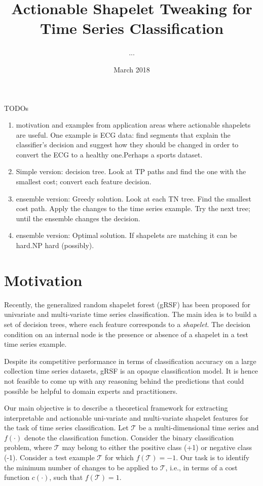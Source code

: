 \documentclass[smallextended,natbib]{svjour3}
\title{Actionable Shapelet Tweaking for Time Series Classification}
\author{...}
\date{March 2018}
\begin{document}
\maketitle

TODOs
\begin{enumerate}
\item motivation and examples from application areas where actionable shapelets are useful. One example is ECG data: find segments that explain the classifier's decision and suggest how they should be changed in order to convert the ECG to a healthy one.Perhaps a sports dataset.

\item Simple version: decision tree. Look at TP paths and find the one with the smallest cost; convert each feature decision.

\item ensemble version: Greedy solution. Look at each TN tree. Find the smallest cost path. Apply the changes to the time series example. Try the next tree; until the ensemble changes the decision. 

\item  ensemble version: Optimal solution. If shapelets are matching it can be hard.NP hard (possibly). 
\end{enumerate}

\section{Motivation}
Recently, the generalized random shapelet forest (gRSF) \citep{KarlssonPB16} has been proposed for univariate and multi-variate time series classification. The main idea is to build a set of decision trees, where each feature corresponds to a \emph{shapelet}. The decision condition on an internal node is the presence or absence of a shapelet in a test time series example.

Despite its competitive performance in terms of classification accuracy on a large collection time series datasets, gRSF is an opaque classification model. It is hence not feasible to come up with any reasoning behind the predictions that could possible be helpful to domain experts and practitioners.

Our main objective is to describe a theoretical framework for extracting interpretable and actionable uni-variate and multi-variate shapelet features for the task of time series classification. Let $\mathcal{T}$ be a multi-dimensional time series and $f(\cdot)$ denote the classification function. Consider the binary classification problem, where $\mathcal{T}$ may belong to either the positive class (+1) or negative class (-1). Consider a test example $\mathcal{T}$ for which $f(\mathcal{T}) = -1$. Our task is to identify the minimum number of changes to be applied to $\mathcal{T}$, i.e., in terms of a cost function $c(\cdot)$, such that $f(\mathcal{T}) = 1$.
\end{document}
